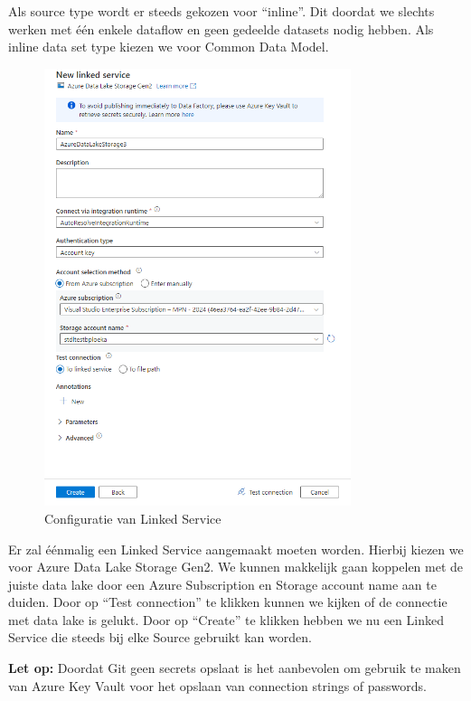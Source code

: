 Als source type wordt er steeds gekozen voor ``inline''. Dit doordat we slechts werken met één enkele dataflow en geen gedeelde datasets nodig hebben. Als inline data set type kiezen we voor Common Data Model.

\begin{figure}[H]
    \centering
    \includegraphics[width=0.8\textwidth]{./graphics/adf/source_table_3_specific}
    \caption{Configuratie van Linked Service}
    \label{fig:linked-service}
\end{figure}

Er zal éénmalig een Linked Service aangemaakt moeten worden. Hierbij kiezen we voor Azure Data Lake Storage Gen2. We kunnen makkelijk gaan koppelen met de juiste data lake door een Azure Subscription en Storage account name aan te duiden. Door op ``Test connection'' te klikken kunnen we kijken of de connectie met data lake is gelukt. Door op ``Create'' te klikken hebben we nu een Linked Service die steeds bij elke Source gebruikt kan worden.

\textbf{Let op:} Doordat Git geen secrets opslaat is het aanbevolen om gebruik te maken van Azure Key Vault voor het opslaan van connection strings of passwords.

